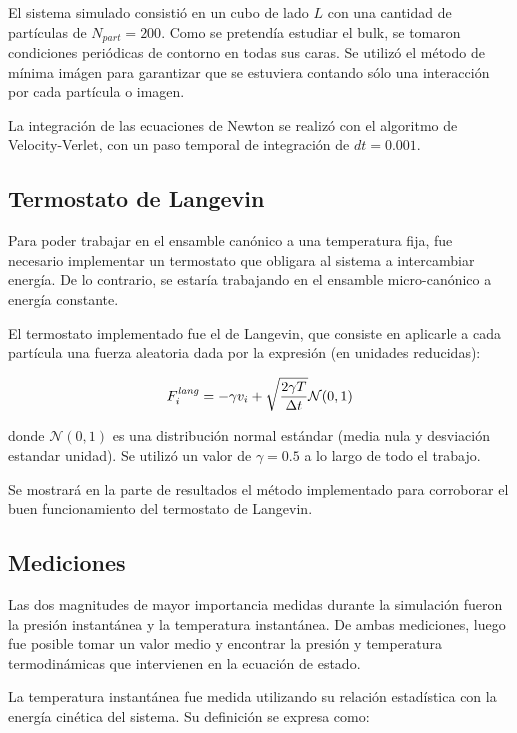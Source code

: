 \documentclass[a4paper,12pt]{article}
\begin{document}
El sistema simulado consistió en un cubo de lado $L$ con una cantidad de 
partículas de $N_{part}=200$. Como se pretendía estudiar el bulk, se tomaron 
condiciones periódicas de contorno en todas sus caras. Se utilizó el método de 
mínima imágen para garantizar que se estuviera contando sólo una interacción 
por cada partícula o imagen. 

La integración de las ecuaciones de Newton se realizó con el algoritmo de 
Velocity-Verlet, con un paso temporal de integración de $dt=0.001$.

\subsection{Termostato de Langevin}

Para poder trabajar en el ensamble canónico a una temperatura fija, fue 
necesario implementar un termostato que obligara al sistema a intercambiar 
energía. De lo contrario, se estaría trabajando en el ensamble micro-canónico a 
energía constante.

El termostato implementado fue el de Langevin, que consiste en aplicarle a cada 
partícula una fuerza aleatoria dada por la expresión (en unidades reducidas):

\begin{equation}\label{eq:termo}
 F_i^{\it lang} = - \gamma  v_i + \sqrt{\frac{2\gamma T}{\Delta t}} \mathcal 
 N(0,1)
\end{equation}

\noindent donde $\mathcal N(0,1)$ es una distribución normal estándar (media 
nula y desviación estandar unidad). Se utilizó un valor de $\gamma=0.5$ a lo 
largo de todo el trabajo.

Se mostrará en la parte de resultados el método implementado para corroborar el 
buen funcionamiento del termostato de Langevin.

\subsection{Mediciones}

Las dos magnitudes de mayor importancia medidas durante la simulación fueron la 
presión instantánea y la temperatura instantánea. De ambas mediciones, luego 
fue posible tomar un valor medio y encontrar la presión y temperatura 
termodinámicas que intervienen en la ecuación de estado.

La temperatura instantánea fue medida utilizando su relación estadística con la 
energía cinética del sistema. Su definición se expresa como:
\end{document}
